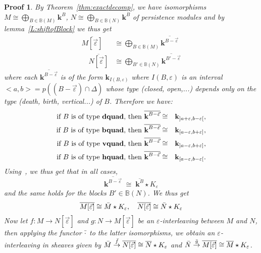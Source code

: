 \documentclass[a4paper, english, 11pt]{article}
\newcommand{\kk}[0]{\textbf{k}}
\newcommand{\0}{\vec{0}}
\newtheorem*{pf}{Proof} }
\begin{document}
\begin{pf}
 By Theorem~\ref{thm:exactdecomp}, we have  isomorphisms 
 $M \cong\bigoplus_{B\in \mathbb{B}(M)} \kk^B$, 
 $N \cong \bigoplus_{B\in \mathbb{B}(N)} \kk^B$ of persistence modules and by lemma~\ref{L:shiftofBlock} 
 we thus get 
 \begin{align*}\overline{M[\vec{\varepsilon}]} &\cong \bigoplus_{B\in \mathbb{B}(M)} \overline{\kk^{B -\vec{\varepsilon}}}  \\ 
  \quad \overline{N[\vec{\varepsilon}]} &\cong \bigoplus_{B'\in \mathbb{B}(N)} \overline{\kk^{B' -\vec{\varepsilon}} }
  \end{align*}
 where each $\overline{\kk^{B -\vec{\varepsilon}}}$ is of the form 
 $\kk_{I(B, \varepsilon)}$ where $I(B, \varepsilon)$ is an interval $<a,b>=p((B-\vec{\varepsilon})\cap \Delta)$ whose type (closed, open,...) depends only on the type (death, birth, vertical...) of $B$. 
Therefore we have: 
\begin{eqnarray*} 
 \text{if $B$ is of type \textbf{dquad}, then }  \overline{\kk^{B-\vec{\varepsilon}}} 
 & \cong & \kk_{]a+\varepsilon, b-\varepsilon [},\\
 \text{if $B$ is of type \textbf{bquad}, then }  \overline{\kk^{B-\vec{\varepsilon}}} 
 & \cong & \kk_{[a-\varepsilon, b+\varepsilon ]}, \\
 \text{if $B$ is of type \textbf{vquad}, then }  \overline{\kk^{B-\vec{\varepsilon}}} 
 & \cong & \kk_{]a-\varepsilon, b+\varepsilon ]}, \\
 \text{if $B$ is of type \textbf{hquad}, then }  \overline{\kk^{B-\vec{\varepsilon}}} 
 & \cong & \kk_{[a-\varepsilon, b-\varepsilon [}.
\end{eqnarray*}
 Using~\cite[Proposition 3.8]{Berk18}, we thus get that  in all cases, 
 $$ \overline{\kk^{B-\vec{\varepsilon}}} 
 \; \cong \;  \overline{\kk^B} \star K_\varepsilon $$ and the same holds for the blocks $B'\in 
 \mathbb{B}(N)$.  
 We thus get 
 $$\overline{M [\vec{\varepsilon}]} \cong \Bar{M}\star K_{\varepsilon}, \quad  \overline{N [\vec{\varepsilon}]} \cong \Bar{N}\star K_{\varepsilon}$$
 Now let $f: M\to N[\vec{\varepsilon}]$ and $g: N\to M[\vec{\varepsilon}]$ be an $\varepsilon$-interleaving between $M$ and $N$, then applying the functor $\Bar{\cdot}$ to the latter isomorphisms, we obtain  an $\varepsilon$-interleaving in sheaves given by  
 $ \Bar{M}\stackrel{\Bar{f}}\to \overline{N[\vec{\varepsilon}]}\cong \overline{N}\star K_\varepsilon$ 
 and $\Bar{N}\stackrel{\Bar{g}}\to \overline{M[\vec{\varepsilon}]}\cong \overline{M}\star K_{\varepsilon}$.
\end{pf}
\end{document}
